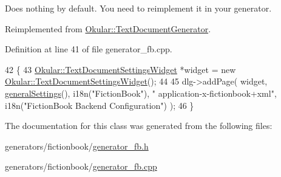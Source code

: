 Does nothing by default. You need to reimplement it in your generator. 



Reimplemented from \hyperlink{classOkular_1_1TextDocumentGenerator_acc42fa387044ecf9f26bc1b4952ad6d3}{Okular\+::\+Text\+Document\+Generator}.



Definition at line 41 of file generator\+\_\+fb.\+cpp.


\begin{DoxyCode}
42 \{
43     \hyperlink{classOkular_1_1TextDocumentSettingsWidget}{Okular::TextDocumentSettingsWidget} *widget = \textcolor{keyword}{new} 
      \hyperlink{classOkular_1_1TextDocumentSettingsWidget}{Okular::TextDocumentSettingsWidget}();
44 
45     dlg->addPage( widget, \hyperlink{classOkular_1_1TextDocumentGenerator_a776f1b9f38f55fdf086e022388ee4e36}{generalSettings}(), i18n(\textcolor{stringliteral}{"FictionBook"}), \textcolor{stringliteral}{"
      application-x-fictionbook+xml"}, i18n(\textcolor{stringliteral}{"FictionBook Backend Configuration"}) );
46 \}
\end{DoxyCode}


The documentation for this class was generated from the following files\+:\begin{DoxyCompactItemize}
\item 
generators/fictionbook/\hyperlink{generator__fb_8h}{generator\+\_\+fb.\+h}\item 
generators/fictionbook/\hyperlink{generator__fb_8cpp}{generator\+\_\+fb.\+cpp}\end{DoxyCompactItemize}
